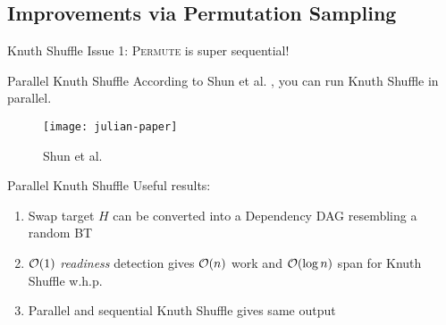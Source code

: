 \subsection{Improvements via Permutation Sampling}

\begin{frame}{Knuth Shuffle}
  Issue 1: \textsc{Permute} is super sequential!

  \begin{algorithm}[H]
    \caption{\textsc{Permute} or Knuth Shuffle via Fisher-Yates}
    \begin{algorithmic}
      \EndFor
    \end{algorithmic}
  \end{algorithm}
\end{frame}

\begin{frame}{Parallel Knuth Shuffle}
  According to Shun et al. \cite{julian-parperm}, you can run Knuth Shuffle in
  parallel.

  \begin{figure}[ht]
    \begin{center}
      \texttt{[image: julian-paper]}
    \end{center}
    \caption{Shun et al. \cite{julian-parperm}}
  \end{figure}
\end{frame}

\begin{frame}{Parallel Knuth Shuffle}
  Useful results:
  \begin{enumerate}
    \item Swap target \(H\) can be converted into a Dependency DAG resembling a random BT
    \item \(\mathcal{O}(1)\) \textit{readiness} detection gives \(\mathcal{O}(n)\) work and
      \(\mathcal{O}(\log n)\) span for Knuth Shuffle w.h.p.
    \item Parallel and sequential Knuth Shuffle gives same output
  \end{enumerate}
\end{frame}

